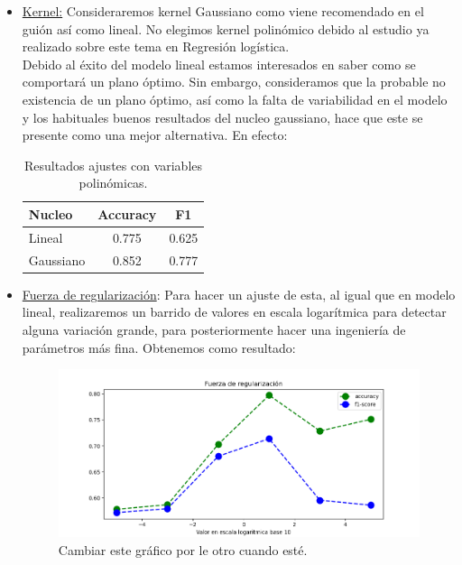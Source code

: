 \documentclass[11pt,a4paper]{article}
\begin{document}
\begin{itemize}
\item \underline{Kernel:} Consideraremos kernel Gaussiano como viene recomendado en el guión así como lineal. No elegimos kernel polinómico debido al estudio ya realizado sobre este tema en Regresión logística.\\

Debido al éxito del modelo lineal estamos interesados en saber como se comportará un plano óptimo. Sin embargo, consideramos que la probable no existencia de un plano
  óptimo, así como la falta de variabilidad en el modelo y los habituales buenos resultados del nucleo gaussiano, hace que este se presente como una mejor alternativa. En efecto:

  
\begin{table}[h]
\begin{center}
\begin{tabular}{|l|c|c|}
\hline
  Nucleo & Accuracy & F1 \\ \hline
Lineal & 0.775 & 0.625 \\
Gaussiano & 0.852 & 0.777  \\\hline
\end{tabular}
\caption{Resultados ajustes con variables polinómicas.}

\end{center}
\end{table}

\item \underline{Fuerza de regularización}: Para hacer un ajuste de esta, al igual que en modelo lineal, realizaremos un barrido de valores en escala logarítmica para detectar alguna variación grande, para posteriormente hacer una ingeniería de parámetros más fina. Obtenemos como resultado:

    \begin{figure}[h!]
      \label{figure:regularization}
      \centering
      \includegraphics[width=\textwidth]{./figures/regularizacion_SVM.png}
      \caption{Cambiar este gráfico por le otro cuando esté.}
    \end{figure}
  

\end{itemize}
\end{document}
